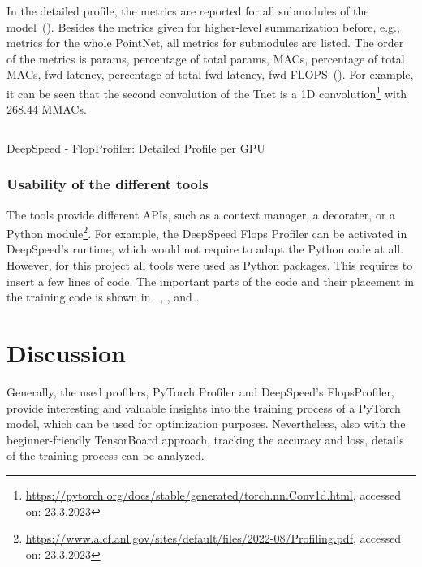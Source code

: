 \documentclass[12pt, a4paper, hidelinks]{article}
\begin{document}
In the detailed profile, the metrics are reported for all submodules of the model~(). Besides the metrics given for higher-level summarization before, e.g., metrics for the whole PointNet, all metrics for submodules are listed. The order of the metrics is params, percentage of total params, MACs, percentage of total MACs, fwd latency, percentage of total fwd latency, fwd FLOPS~(). For example, it can be seen that the second convolution of the Tnet is a 1D convolution\footnote{\url{https://pytorch.org/docs/stable/generated/torch.nn.Conv1d.html}, accessed on: 23.3.2023} with $268.44$ MMACs.

\begin{listing}[H]
\inputminted[xleftmargin=1em,linenos,fontsize=\small, firstline=41,lastline=48, breaklines]{python}{./assets/scap_gtx1080_deepspeed_14615344_4294967294_one-epoch.txt}
\caption{DeepSpeed - FlopProfiler: Detailed Profile per GPU}
\label{lst:scap_gtx1080_deepspeed_14615344_4294967294_one-epoch-detailed}
\end{listing}

\subsubsection{Usability of the different tools}
\label{sec:r-usability}

The tools provide different \ac{API}s, such as a context manager, a decorater, or a Python module\footnote{\url{https://www.alcf.anl.gov/sites/default/files/2022-08/Profiling.pdf}, accessed on: 23.3.2023}. For example, the DeepSpeed Flops Profiler can be activated in DeepSpeed's runtime, which would not require to adapt the Python code at all. However, for this project all tools were used as Python packages. This requires to insert a few lines of code. The important parts of the code and their placement in the training code is shown in ~, , and .


\section{Discussion}
\label{sec:discussion}

Generally, the used profilers, PyTorch Profiler and DeepSpeed's FlopsProfiler, provide interesting and valuable insights into the training process of a PyTorch model, which can be used for optimization purposes. Nevertheless, also with the beginner-friendly TensorBoard approach, tracking the accuracy and loss, details of the training process can be analyzed.
\end{document}
